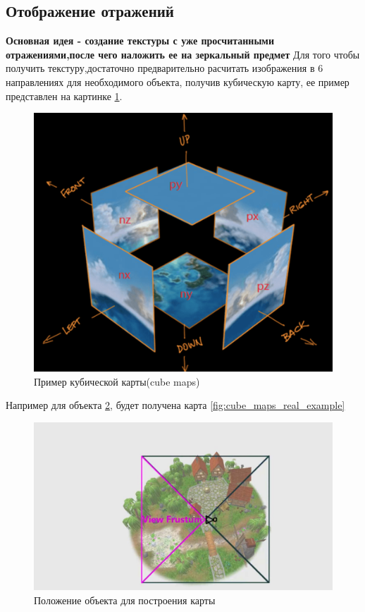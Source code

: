 \documentclass[a4paper,14pt, unknownkeysallowed]{extreport}
\begin{document}
\subsection{Отображение отражений}
\textbf{Основная идея - создание текстуры с уже просчитанными отражениями,после чего наложить ее на зеркальный предмет} \newline
Для того чтобы получить текстуру,достаточно предварительно расчитать изображения в 6 направлениях для необходимого объекта, получив кубическую карту, ее пример представлен на картинке \ref{fig:cube_maps}.\cite{reflexion_types}
\begin{figure}[h]
	\centering
	\includegraphics[scale=0.4]{cube_maps}
	\caption{Пример кубической карты(cube maps)}
	\label{fig:cube_maps}
\end{figure}

Например для объекта \ref{fig:cube_maps_real}, будет получена карта \ref{fig:cube_maps_real_example}


\begin{figure}[H]
	\centering
	\includegraphics[scale=0.4]{cube_maps_real}
	\caption{Положение объекта для построения карты}
	\label{fig:cube_maps_real}
\end{figure}
\end{document}
